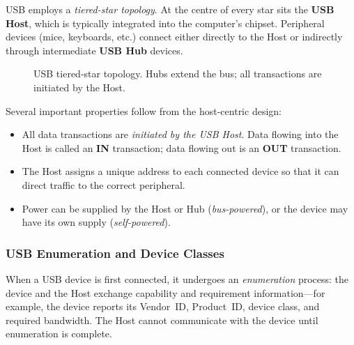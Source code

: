 \documentclass[11pt, a4paper, notitlepage]{report}
\theoremstyle{definition}
\theoremstyle{remark}
\theoremstyle{definition}
\begin{document}
USB employs a \emph{tiered-star topology}. At the centre of every star sits the \textbf{USB Host}, which is typically integrated into the computer's chipset. Peripheral devices (mice, keyboards, etc.) connect either directly to the Host or indirectly through intermediate \textbf{USB Hub} devices.

\begin{figure}[h]
\centering
{}
\caption{USB tiered-star topology. Hubs extend the bus; all transactions are initiated by the Host.}
\label{fig:usb-topology}
\end{figure}

Several important properties follow from the host-centric design:

\begin{itemize}
  \item All data transactions are \emph{initiated by the USB Host}. Data flowing into the Host is called an \textbf{IN} transaction; data flowing out is an \textbf{OUT} transaction.
  \item The Host assigns a unique address to each connected device so that it can direct traffic to the correct peripheral.
  \item Power can be supplied by the Host or Hub (\emph{bus-powered}), or the device may have its own supply (\emph{self-powered}).
\end{itemize}

\subsubsection{USB Enumeration and Device Classes}

When a USB device is first connected, it undergoes an \emph{enumeration} process: the device and the Host exchange capability and requirement information---for example, the device reports its Vendor~ID, Product~ID, device class, and required bandwidth. The Host cannot communicate with the device until enumeration is complete.
\end{document}
